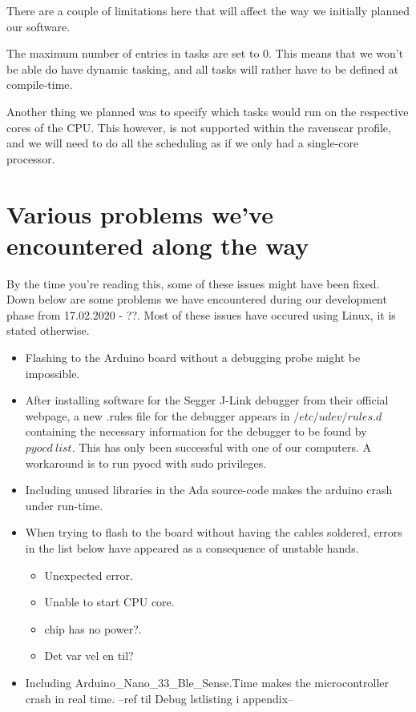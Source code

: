 \documentclass{article}
\begin{document}
There are a couple of limitations here that will affect the way we initially planned our software. 

The maximum number of entries in tasks are set to 0. This means that we won't be able do have dynamic tasking, and all tasks will rather have to be defined at compile-time. 

Another thing we planned was to specify which tasks would run on the respective cores of the CPU. This however, is not supported within the ravenscar profile, and we will need to do all the scheduling as if we only had a single-core processor. 

\section{Various problems we've encountered along the way}

By the time you're reading this, some of these issues might have been fixed. Down below are some problems we have encountered during our development phase from 17.02.2020 - ??. Most of these issues have occured using Linux, it is stated otherwise.

\begin{itemize}
	\item Flashing to the Arduino board without a debugging probe might be impossible.

	\item After installing software for the Segger J-Link debugger from their official webpage, a new .rules file for the debugger appears in $/etc/udev/rules.d$ containing the necessary information for the debugger to be found by $pyocd\ list$. This has only been successful with one of our computers. A workaround is to run pyocd with sudo privileges.

	\item Including unused libraries in the Ada source-code makes the arduino crash under run-time.

	\item When trying to flash to the board without having the cables soldered, errors in the list below have appeared as a consequence of unstable hands.
		\begin{itemize}
			\item Unexpected error.
			\item Unable to start CPU core.
			\item chip has no power?.
			\item Det var vel en til?
		\end{itemize}

	\item Including Arduino\_Nano\_33\_Ble\_Sense.Time makes the microcontroller crash in real time. --ref til Debug lstlisting i appendix--

\end{itemize}
\end{document}
